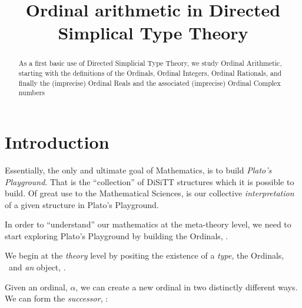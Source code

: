\documentclass[a4paper]{amsart}
\begin{document}
\sloppy

\title[Ordinal Arithmetic]{Ordinal arithmetic in Directed Simplical Type Theory}

%

\begin{abstract}
As a first basic use of Directed Simplicial Type Theory, we study Ordinal Arithmetic, starting with the definitions of the Ordinals, Ordinal Integers, Ordinal Rationals, and finally the (imprecise) Ordinal Reals and the associated (imprecise) Ordinal Complex numbers
\end{abstract}
\maketitle
\tableofcontents

\section{Introduction}

Essentially, the only and ultimate goal of Mathematics, is to build
\emph{Plato's Playground}. That is the ``collection'' of DiSiTT structures which
it is possible to build. Of great use to the Mathematical Sciences, is our
collective \emph{interpretation} of a given structure in Plato's Playground.

In order to ``understand'' our mathematics at the meta-theory level, we need to
start exploring Plato's Playground by building the Ordinals, \Ordinal.

We begin at the \emph{theory} level by positing the existence of a \emph{type},
the Ordinals, \Ordinal\ and \emph{an} object, \judgement{\zero}{\Ordinal}.

\begin{deAxiom}
\conclusion{}{\judgement{\Ordinal}{\Universe}}
\end{deAxiom}

\begin{deAxiom}
\conclusion{}{\judgement{\zero}{\Ordinal_{\cdot}}}
\end{deAxiom}

Given an ordinal, $\alpha$, we can create a new ordinal in two distinctly
different ways. We can form the \emph{successor}, \successor{\alpha}:

\begin{deAxiom}
\hypothesis{\Gamma}{\judgement{\alpha}{\Ordinal}}
\conclusion{\Gamma}{\judgement{\successor{\alpha}}{\Ordinal}}
\end{deAxiom}
\end{document}
